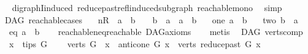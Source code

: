\begin{isabellebody}
%
\isadelimproof
\ \ %
\endisadelimproof
%
\isatagproof
{}\isamarkupfalse%
\ digraphI{\isacharunderscore}{\kern0pt}induced\ reduce{\isacharunderscore}{\kern0pt}past{\isacharunderscore}{\kern0pt}refl{\isacharunderscore}{\kern0pt}induced{\isacharunderscore}{\kern0pt}subgraph\ reachable{\isacharunderscore}{\kern0pt}mono\ \isamarkupfalse%
\ simp%
\endisatagproof
{\isafoldproof}%
%
\isadelimproof
%
\endisadelimproof
%
\isadelimdocument
%
\endisadelimdocument
%
\isatagdocument
%
\isamarkuptrue%
%
\endisatagdocument
{\isafolddocument}%
%
\isadelimdocument
%
\endisadelimdocument
{}\isamarkupfalse%
\ {\isacharparenleft}{\kern0pt}\ DAG{\isacharparenright}{\kern0pt}\ reachable{}{\isacharunderscore}{\kern0pt}cases{\isacharcolon}{\kern0pt}\isanewline
\ \ \ {\isacharparenleft}{\kern0pt}nR{\isacharparenright}{\kern0pt}\ {\isachardoublequoteopen}{\isasymnot}\ a\ {\isasymrightarrow}\isactrlsup {\isacharplus}{\kern0pt}\ b\ {\isasymand}\ {\isasymnot}\ \ b\ {\isasymrightarrow}\isactrlsup {\isacharplus}{\kern0pt}\ a\ {\isasymand}\ a\ {\isasymnoteq}\ b{\isachardoublequoteclose}\isanewline
\ \ {\isacharbar}{\kern0pt}\ {\isacharparenleft}{\kern0pt}one{\isacharparenright}{\kern0pt}\ {\isachardoublequoteopen}a\ {\isasymrightarrow}\isactrlsup {\isacharplus}{\kern0pt}\ b{\isachardoublequoteclose}\isanewline
\ \ {\isacharbar}{\kern0pt}\ {\isacharparenleft}{\kern0pt}two{\isacharparenright}{\kern0pt}\ {\isachardoublequoteopen}b\ {\isasymrightarrow}\isactrlsup {\isacharplus}{\kern0pt}\ a{\isachardoublequoteclose}\isanewline
\ \ {\isacharbar}{\kern0pt}\ {\isacharparenleft}{\kern0pt}eq{\isacharparenright}{\kern0pt}\ {\isachardoublequoteopen}a\ {\isacharequal}{\kern0pt}\ b{\isachardoublequoteclose}\isanewline
%
\isadelimproof
\ \ %
\endisadelimproof
%
\isatagproof
{}\isamarkupfalse%
\ reachable{\isacharunderscore}{\kern0pt}neq{\isacharunderscore}{\kern0pt}reachable{}\ DAG{\isacharunderscore}{\kern0pt}axioms\isanewline
\ \ \isamarkupfalse%
\ metis%
\endisatagproof
{\isafoldproof}%
%
\isadelimproof
\isanewline
%
\endisadelimproof
\isanewline
{}\isamarkupfalse%
\ {\isacharparenleft}{\kern0pt}\ DAG{\isacharparenright}{\kern0pt}\ verts{\isacharunderscore}{\kern0pt}comp{\isacharcolon}{\kern0pt}\isanewline
\ \ \ {\isachardoublequoteopen}x\ {\isasymin}\ tips\ G{\isachardoublequoteclose}\isanewline
\ \ \ {\isachardoublequoteopen}\ verts\ G\ {\isacharequal}{\kern0pt}\ {\isacharbraceleft}{\kern0pt}x{\isacharbraceright}{\kern0pt}\ {\isasymunion}\ {\isacharparenleft}{\kern0pt}anticone\ G\ x{\isacharparenright}{\kern0pt}\ {\isasymunion}\ {\isacharparenleft}{\kern0pt}verts\ {\isacharparenleft}{\kern0pt}reduce{\isacharunderscore}{\kern0pt}past\ G\ x{\isacharparenright}{\kern0pt}{\isacharparenright}{\kern0pt}{\isachardoublequoteclose}\isanewline

\end{isabellebody}
